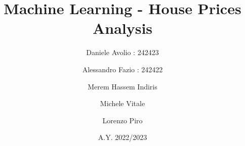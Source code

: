 \documentclass[12]{report}
\begin{document}
\title{Machine Learning - House Prices Analysis}
\author{Daniele Avolio : 242423\\
    \and
    Alessandro Fazio : 242422\\
    \and
    Merem Hassem Indiris\\
    \and
    Michele Vitale\\
    \and
    Lorenzo Piro\\}
\date{A.Y. 2022/2023}
\maketitle


\begin{titlepage}
    \noindent{}
\end{titlepage}

\tableofcontents



\newpage






\end{document}
